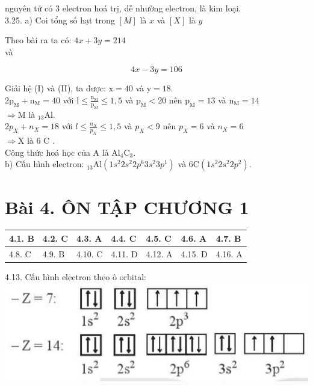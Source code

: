 \documentclass[10pt]{article}
\begin{document}
nguyên tử có 3 electron hoá trị, dễ nhường electron, là kim loại.\\
3.25. a) Coi tổng số hạt trong $[M]$ là $x$ và $[X]$ là $y$

Theo bài ra ta có: $4 x+3 y=214$\\
và


\begin{equation*}
4 x-3 y=106 \tag{I}
\end{equation*}


Giải hệ (I) và (II), ta được: $\mathrm{x}=40$ và $\mathrm{y}=18$.\\
$2 \mathrm{p}_{\mathrm{M}}+\mathrm{n}_{\mathrm{M}}=40$ với $\mathrm{l} \leq \frac{\mathrm{n}_{\mathrm{M}}}{\mathrm{p}_{\mathrm{M}}} \leq 1,5$ và $\mathrm{p}_{\mathrm{M}}<20$ nên $\mathrm{p}_{\mathrm{M}}=13$ và $\mathrm{n}_{\mathrm{M}}=14$\\
$\Rightarrow \mathrm{M}$ là ${ }_{13} \mathrm{Al}$.\\
$2 p_{X}+n_{X}=18$ với $l \leq \frac{n_{X}}{p_{X}} \leq 1,5$ và $p_{X}<9$ nên $p_{X}=6$ và $n_{X}=6$\\
$\Rightarrow \mathrm{X}$ là 6 C .\\
Công thức hoá học của A là $\mathrm{Al}_{4} \mathrm{C}_{3}$.\\
b) Cấu hình electron: ${ }_{13} \mathrm{Al}\left(1 s^{2} 2 s^{2} 2 p^{6} 3 s^{2} 3 p^{1}\right)$ và $6 \mathrm{C}\left(1 s^{2} 2 s^{2} 2 p^{2}\right)$.

\section*{Bài 4. ÔN TẬP CHƯƠNG 1}
\begin{center}
\begin{tabular}{|l|l|l|l|l|l|l|}
\hline
4.1. B & 4.2. C & 4.3. A & 4.4. C & 4.5. C & 4.6. A & 4.7. B \\
\hline
4.8. C & 4.9. B & 4.10. C & 4.11. D & 4.12. A & 4.15. D & 4.16. A \\
\hline
\end{tabular}
\end{center}

4.13. Cấu hình electron theo ô orbital:\\
\includegraphics[max width=\textwidth, center]{2025_10_23_ee735750217b2aca435cg-05}
\end{document}
